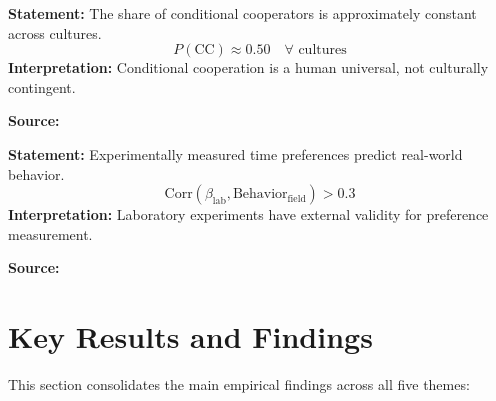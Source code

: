 \begin{tcolorbox}[colback=gray!5!white, colframe=gray!75!black,
    title=Axiom UNMAPPED_SU-5: Conditional Cooperation Universality]
\textbf{Statement:} The share of conditional cooperators is approximately constant across cultures.
\begin{equation}
P(\text{CC}) \approx 0.50 \quad \forall \text{ cultures}
\end{equation}
\textbf{Interpretation:} Conditional cooperation is a human universal, not culturally contingent.

\textbf{Source:} \citet{kocher2008conditional}
\end{tcolorbox}

\begin{tcolorbox}[colback=gray!5!white, colframe=gray!75!black,
    title=Axiom UNMAPPED_SU-6: Lab-Field Validity]
\textbf{Statement:} Experimentally measured time preferences predict real-world behavior.
\begin{equation}
\text{Corr}(\beta_{\text{lab}}, \text{Behavior}_{\text{field}}) > 0.3
\end{equation}
\textbf{Interpretation:} Laboratory experiments have external validity for preference measurement.

\textbf{Source:} \citet{sutter2013impatience}
\end{tcolorbox}


\section{Key Results and Findings}
\label{sec:su-results}

This section consolidates the main empirical findings across all five themes:

